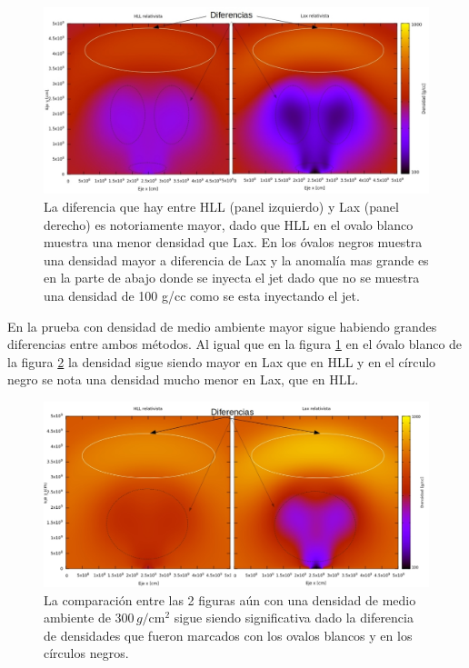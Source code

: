 \documentclass[12pt,a4paper]{book}
\begin{document}
\begin{figure}[H] \label{fig:analisis_jet_densidad_300} %
\centering
\includegraphics[scale=0.5]{./Figuras/Pruebas/Prueba_jet/analisis_jet_densidad_300} 
\caption{La diferencia que hay entre HLL (panel izquierdo) y Lax (panel derecho) es notoriamente mayor, dado que HLL en el ovalo blanco muestra una menor densidad que Lax. En los óvalos negros muestra una densidad mayor a diferencia de Lax y la anomalía mas grande es en la parte de abajo donde se inyecta el jet dado que no se muestra una densidad de 100 g/cc como se esta inyectando el jet.}
\end{figure}

En la prueba con densidad de medio ambiente mayor sigue habiendo grandes diferencias entre ambos métodos. Al igual que en la figura \ref{fig:analisis_jet_densidad_300} en el óvalo blanco de la figura \ref{fig:analisis_jet_densidad_500} la densidad sigue siendo mayor en Lax que en HLL y en el círculo negro se nota una densidad mucho menor en Lax, que en HLL.

\begin{figure}[H] \label{fig:analisis_jet_densidad_500} %
\centering
\includegraphics[scale=0.5]{./Figuras/Pruebas/Prueba_jet/analisis_jet_densidad_500} 
\caption{La comparación entre las 2 figuras aún con una densidad de medio ambiente de $300 \, g/\mathrm{cm}^2 $ sigue siendo significativa dado la diferencia de densidades que fueron marcados con los ovalos blancos y en los círculos negros.}
\end{figure}
\end{document}

